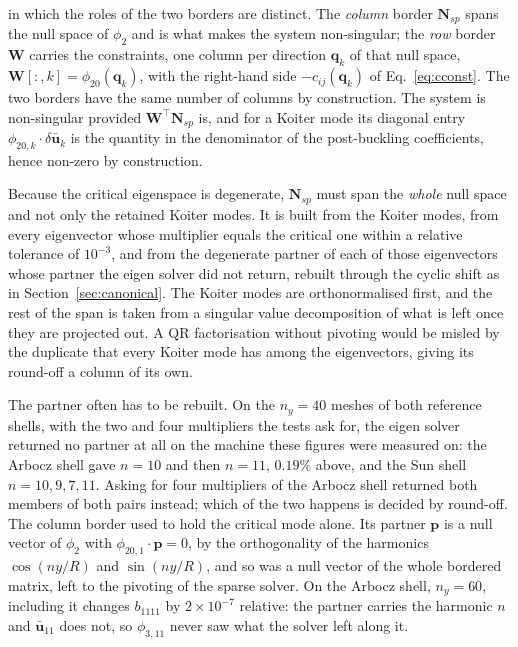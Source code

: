 \documentclass[11pt,a4paper]{article}
\begin{document}
\noindent in which the roles of the two borders are distinct.  The
\emph{column} border $\boldsymbol{N}_{sp}$ spans the null space of $\phi_2$ and
is what makes the system non-singular; the \emph{row} border $\boldsymbol{W}$
carries the constraints, one column per direction $\boldsymbol{q}_k$ of that
null space, $\boldsymbol{W}[:,k] = \phi_{20}(\boldsymbol{q}_k)$, with the
right-hand side $-c_{ij}(\boldsymbol{q}_k)$ of Eq.~\ref{eq:cconst}.  The two
borders have the same number of columns by construction.  The system is
non-singular provided $\boldsymbol{W}^\top\boldsymbol{N}_{sp}$ is, and for a
Koiter mode its diagonal entry $\phi_{20,k}\cdot\delta\boldsymbol{\bar{u}}_k$
is the quantity in the denominator of the post-buckling coefficients, hence
non-zero by construction.

Because the critical eigenspace is degenerate, $\boldsymbol{N}_{sp}$ must span
the \emph{whole} null space and not only the retained Koiter modes.  It is
built from the Koiter modes, from every eigenvector whose multiplier equals
the critical one within a relative tolerance of $10^{-3}$, and from the
degenerate partner of each of those eigenvectors whose partner the eigen
solver did not return, rebuilt through the cyclic shift as in
Section~\ref{sec:canonical}.  The Koiter modes are orthonormalised first, and
the rest of the span is taken from a singular value decomposition of what is
left once they are projected out.  A QR factorisation without pivoting would
be misled by the duplicate that every Koiter mode has among the eigenvectors,
giving its round-off a column of its own.

The partner often has to be rebuilt.  On the $n_y = 40$ meshes of both
reference shells, with the two and four multipliers the tests ask for, the
eigen solver returned no partner at all on the machine these figures were
measured on: the Arbocz shell gave $n = 10$ and then $n = 11$, $0.19\%$
above, and the Sun shell $n = 10, 9, 7, 11$.  Asking for four multipliers of
the Arbocz shell returned both members of both pairs instead; which of the two
happens is decided by round-off.  The column border used to hold the critical
mode alone.
Its partner $\boldsymbol{p}$ is a null vector of $\phi_2$ with
$\phi_{20,1}\cdot\boldsymbol{p} = 0$, by the orthogonality of the harmonics
$\cos(n y/R)$ and $\sin(n y/R)$, and so was a null vector of the whole
bordered matrix, left to the pivoting of the sparse solver.  On the Arbocz
shell, $n_y = 60$, including it changes $b_{1111}$ by $2\times10^{-7}$
relative: the partner carries the harmonic $n$ and
$\boldsymbol{\bar{u}}_{11}$ does not, so $\phi_{3,11}$ never saw what the
solver left along it.
\end{document}
